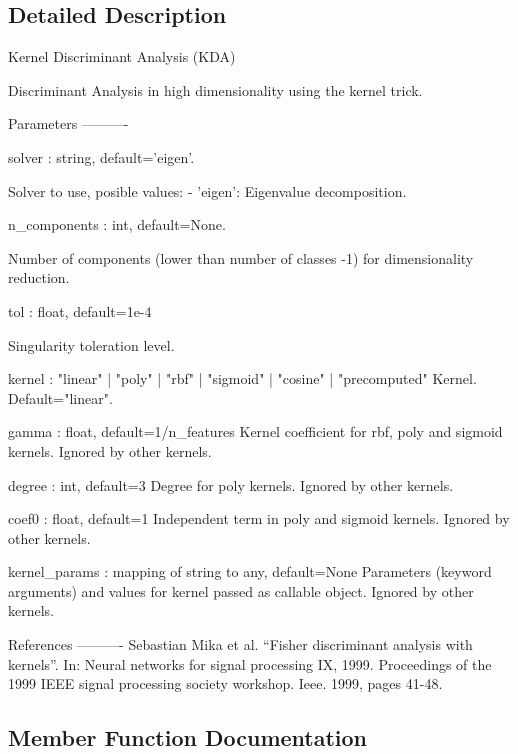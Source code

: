 \subsection{Detailed Description}
\begin{DoxyVerb}Kernel Discriminant Analysis (KDA)

Discriminant Analysis in high dimensionality using the kernel trick.

Parameters
----------

solver : string, default='eigen'.

    Solver to use, posible values:
        - 'eigen': Eigenvalue decomposition.

n_components : int, default=None.

    Number of components (lower than number of classes -1) for dimensionality reduction.

tol : float, default=1e-4

    Singularity toleration level.

kernel : "linear" | "poly" | "rbf" | "sigmoid" | "cosine" | "precomputed"
    Kernel. Default="linear".

gamma : float, default=1/n_features
    Kernel coefficient for rbf, poly and sigmoid kernels. Ignored by other
    kernels.

degree : int, default=3
    Degree for poly kernels. Ignored by other kernels.

coef0 : float, default=1
    Independent term in poly and sigmoid kernels.
    Ignored by other kernels.

kernel_params : mapping of string to any, default=None
    Parameters (keyword arguments) and values for kernel passed as
    callable object. Ignored by other kernels.

References
----------
    Sebastian Mika et al. “Fisher discriminant analysis with kernels”. In: Neural networks for signal
    processing IX, 1999. Proceedings of the 1999 IEEE signal processing society workshop. Ieee. 1999,
    pages 41-48.\end{DoxyVerb}
 

\subsection{Member Function Documentation}
